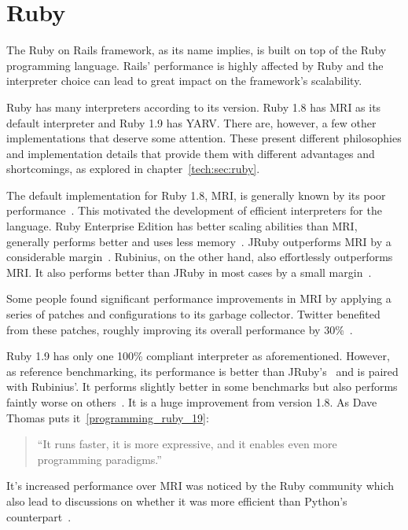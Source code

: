 \section{Ruby} %
\label{state:sec:ruby}
The Ruby on Rails framework, as its name implies, is built on top of the Ruby programming language. Rails' performance is highly affected by Ruby and the interpreter choice can lead to great impact on the framework's scalability.

Ruby has many interpreters according to its version. Ruby 1.8 has MRI as its default interpreter and Ruby 1.9 has YARV. There are, however, a few other implementations that deserve some attention. These present different philosophies and implementation details that provide them with different advantages and shortcomings, as explored in chapter~\ref{tech:sec:ruby}.

The default implementation for Ruby 1.8, MRI, is generally known by its poor performance~\cite{6tips_for_mri}. This motivated the development of efficient interpreters for the language. Ruby Enterprise Edition has better scaling abilities than MRI, generally performs better and uses less memory~\cite{ree_benchmarks}. JRuby outperforms MRI by a considerable margin~\cite{ruby19_performance}. Rubinius, on the other hand, also effortlessly outperforms MRI. It also performs better than JRuby in most cases by a small margin~\cite{rvm_rubinius_benchmarks}.

Some people found significant performance improvements in MRI by applying a series of patches and configurations to its garbage collector. Twitter benefited from these patches, roughly improving its overall performance by 30\%~\cite{ruby_gc_tuning}.

Ruby 1.9 has only one 100\% compliant interpreter as aforementioned. However, as reference benchmarking, its performance is better than JRuby's~\cite{ruby19_performance} and is paired with Rubinius'. It performs slightly better in some benchmarks but also performs faintly worse on others~\cite{rvm_rubinius_benchmarks,ruby_interpreter_benchmarks}. It is a huge improvement from version 1.8. As Dave Thomas puts it~\ref{programming_ruby_19}:
\begin{quote}
  ``It runs faster, it is more expressive, and it enables even more programming paradigms.''
\end{quote}
It's increased performance over MRI was noticed by the Ruby community which also lead to discussions on whether it was more efficient than Python's counterpart~\cite{ruby19_python}.

